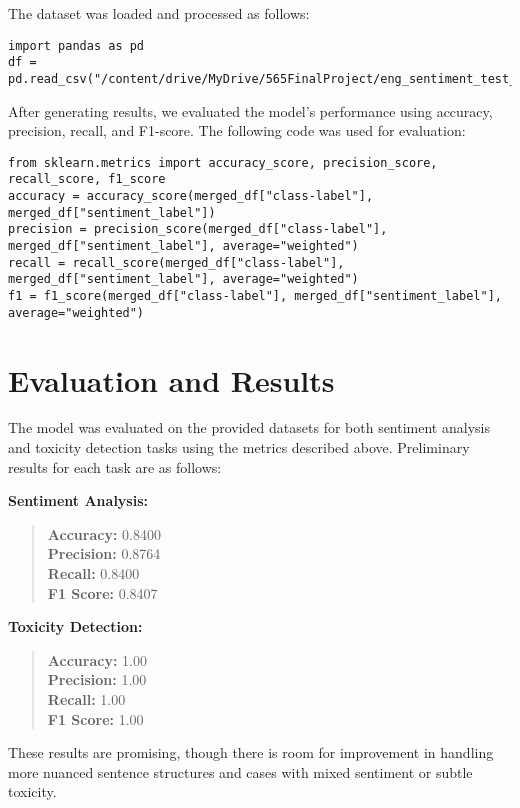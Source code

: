 \documentclass[11pt]{article}
\begin{document}
The dataset was loaded and processed as follows:
\begin{lstlisting}
import pandas as pd
df = pd.read_csv("/content/drive/MyDrive/565FinalProject/eng_sentiment_test_solutions.csv")
\end{lstlisting}

After generating results, we evaluated the model's performance using accuracy, precision, recall, and F1-score. The following code was used for evaluation:

\begin{lstlisting}
from sklearn.metrics import accuracy_score, precision_score, recall_score, f1_score
accuracy = accuracy_score(merged_df["class-label"], merged_df["sentiment_label"])
precision = precision_score(merged_df["class-label"], merged_df["sentiment_label"], average="weighted")
recall = recall_score(merged_df["class-label"], merged_df["sentiment_label"], average="weighted")
f1 = f1_score(merged_df["class-label"], merged_df["sentiment_label"], average="weighted")
\end{lstlisting}

\section{Evaluation and Results}
The model was evaluated on the provided datasets for both sentiment analysis and toxicity detection tasks using the metrics described above. Preliminary results for each task are as follows:

\textbf{Sentiment Analysis:}
\begin{quote}
  \textbf{Accuracy:} 0.8400 \\
  \textbf{Precision:} 0.8764 \\
  \textbf{Recall:} 0.8400 \\
  \textbf{F1 Score:} 0.8407
\end{quote}

\textbf{Toxicity Detection:}
\begin{quote}
  \textbf{Accuracy:} 1.00 \\
  \textbf{Precision:} 1.00 \\
  \textbf{Recall:} 1.00 \\
  \textbf{F1 Score:} 1.00
\end{quote}

These results are promising, though there is room for improvement in handling more nuanced sentence structures and cases with mixed sentiment or subtle toxicity.
\end{document}
